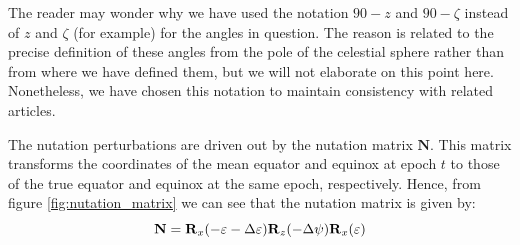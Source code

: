 \documentclass[../main.tex]{subfiles}
\begin{document}
The reader may wonder why we have used the notation $90-z$ and $90-\zeta$ instead of $z$ and $\zeta$ (for example) for the angles in question. The reason is related to the precise definition of these angles from the pole of the celestial sphere rather than from where we have defined them, but we will not elaborate on this point here. Nonetheless, we have chosen this notation to maintain consistency with related articles.

The nutation perturbations are driven out by the nutation matrix $\mathbf{N}$. This matrix transforms the coordinates of the mean equator and equinox at epoch $t$ to those of the true equator and equinox at the same epoch, respectively. Hence, from figure \cref{fig:nutation_matrix} we can see that the nutation matrix is given by:
\begin{equation}
  \mathbf{N}=\boldsymbol{\mathrm{R}}_x(-\varepsilon-\Delta \varepsilon)\boldsymbol{\mathrm{R}}_z(-\Delta \psi)\boldsymbol{\mathrm{R}}_x(\varepsilon)
\end{equation}
\end{document}
